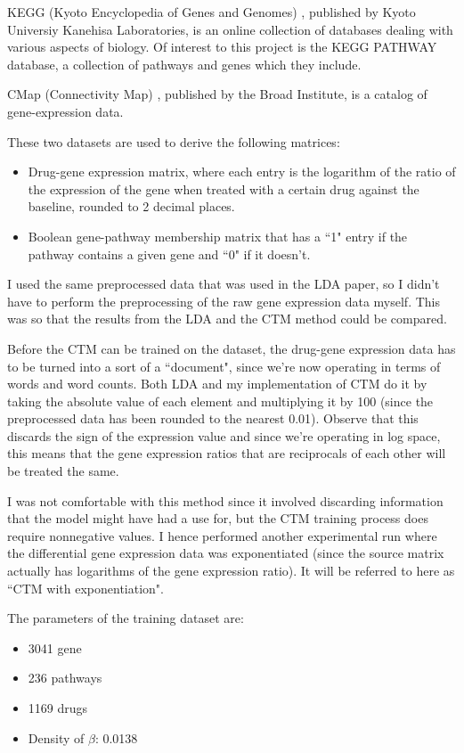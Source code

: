 \documentclass[12pt,a4paper,twoside,openright]{report}
\begin{document}
KEGG (Kyoto Encyclopedia of Genes and Genomes) \cite{KEGG}, published by Kyoto Universiy Kanehisa Laboratories, is an online collection of databases dealing with various aspects of biology. Of interest to this project is the KEGG PATHWAY database, a collection of pathways and genes which they include.

CMap (Connectivity Map) \cite{CMap}, published by the Broad Institute, is a catalog of gene-expression data.

These two datasets are used to derive the following matrices:

\begin{itemize}[noitemsep]
\item Drug-gene expression matrix, where each entry is the logarithm of the ratio of the expression of the gene when treated with a certain drug against the baseline, rounded to 2 decimal places.
\item Boolean gene-pathway membership matrix that has a ``1" entry if the pathway contains a given gene and ``0" if it doesn't.
\end{itemize}

I used the same preprocessed data that was used in the LDA paper, so I didn't have to perform the preprocessing of the raw gene expression data myself. This was so that the results from the LDA and the CTM method could be compared.

Before the CTM can be trained on the dataset, the drug-gene expression data has to be turned into a sort of a ``document", since we're now operating in terms of words and word counts. Both LDA and my implementation of CTM do it by taking the absolute value of each element and multiplying it by 100 (since the preprocessed data has been rounded to the nearest 0.01). Observe that this discards the sign of the expression value and since we're operating in log space, this means that the gene expression ratios that are reciprocals of each other will be treated the same.

I was not comfortable with this method since it involved discarding information that the model might have had a use for, but the CTM training process does require nonnegative values. I hence performed another experimental run where the differential gene expression data was exponentiated (since the source matrix actually has logarithms of the gene expression ratio). It will be referred to here as ``CTM with exponentiation".

The parameters of the training dataset are:
\begin{itemize}[noitemsep]
\item 3041 gene
\item 236 pathways
\item 1169 drugs
\item Density of $\beta$: 0.0138
\end{itemize}
\end{document}
